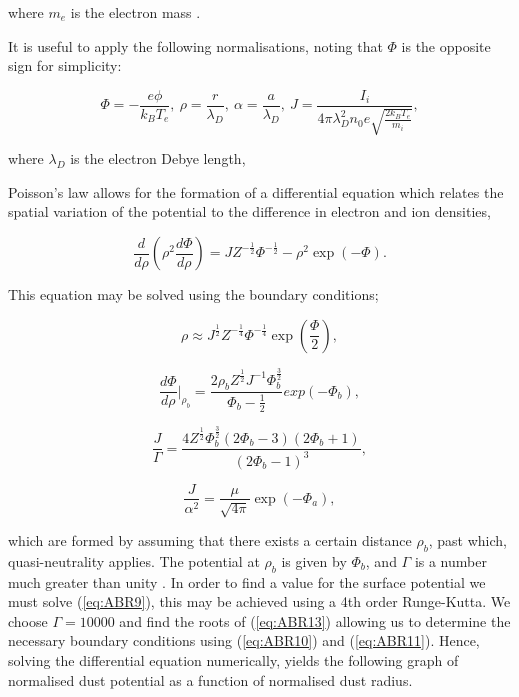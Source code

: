 \documentclass{article}
\begin{document}
\noindent where $m_e$ is the electron mass \cite{ABR}.

\medskip

It is useful to apply the following normalisations, noting that $\Phi$ is the opposite
sign for simplicity:

\begin{equation}\label{eq:ABRnorm}
{\Phi = - \frac{e\phi}{k_B T_e}}, \ {\rho = \frac{r}{\lambda_D}},\ {\alpha = \frac{a}{\lambda_D}},\ {J = \frac{I_i}{4 \pi \lambda_D^2 n_0 e \sqrt{\frac{2k_B T_e}{m_i}}}},
\end{equation}
    
\noindent where $\lambda_D$ is the electron Debye length, 

\medskip

Poisson's law allows for the formation of a differential equation which relates
the spatial variation of the potential to the difference in electron and 
ion densities,

\begin{equation}\label{eq:ABR9} 
\frac{d}{d\rho} \left(\rho^2 \frac{d\Phi}{d\rho}\right) = J Z^{-\frac{1}{2}}\Phi^{-\frac{1}{2}}  - \rho^2 \exp{(-\Phi)}.
\end{equation}

\medskip

\noindent This equation may be solved using the boundary conditions;

\begin{equation}\label{eq:ABR10}
\rho \approx J^{\frac{1}{2}} Z^{-\frac{1}{4}} \Phi^{-\frac{1}{4}} \exp{\left(\frac{\Phi}{2}\right)},
\end{equation}
 
\begin{equation}\label{eq:ABR11}
\frac{d\Phi}{d\rho}\biggr|_{\rho_b} = \frac{2\rho_b Z^{\frac{1}{2}} J^{-1} \Phi_b^{\frac{3}{2}}}{\Phi_b - \frac{1}{2}} exp{(-\Phi_b)},
\end{equation}
 
\begin{equation}\label{eq:ABR13}
\frac{J}{\Gamma} = \frac{4Z^{\frac{1}{2}}\Phi_b^{\frac{3}{2}}(2\Phi_b - 3)(2\Phi_b + 1)}{(2\Phi_b - 1)^3},
\end{equation}

\begin{equation}\label{eq:ABR12}
\frac{J}{\alpha^2} = \frac{\mu}{\sqrt{4\pi}} \exp{\left(-\Phi_a\right)},
\end{equation}

\medskip

\noindent which are formed by assuming that there exists a certain distance $\rho_b$, past which, quasi-neutrality applies. 
The potential at $\rho_b$ is given by $\Phi_b$, and $\Gamma$ is a number much greater than unity \cite{ABR}.
In order to find a value for the surface potential we must solve (\ref{eq:ABR9}), this may be 
achieved using a 4th order Runge-Kutta. We choose $\Gamma = 10000$ and find the roots of 
(\ref{eq:ABR13}) allowing us to determine the necessary boundary conditions 
using (\ref{eq:ABR10}) and (\ref{eq:ABR11}). Hence, solving the differential equation numerically, yields 
the following graph of normalised dust potential as a function of normalised dust radius.
\end{document}
